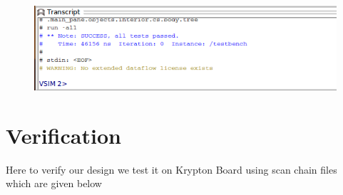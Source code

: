 \documentclass[12pt]{article}
\begin{document}
    \begin{figure}[H]
        \centering
        \includegraphics[width=0.8\linewidth]{gateLevel (copy).png}
    \end{figure}
    
\newpage
\section{Verification}
    Here to verify our design we test it on Krypton Board using scan chain files which are given below
\end{document}
